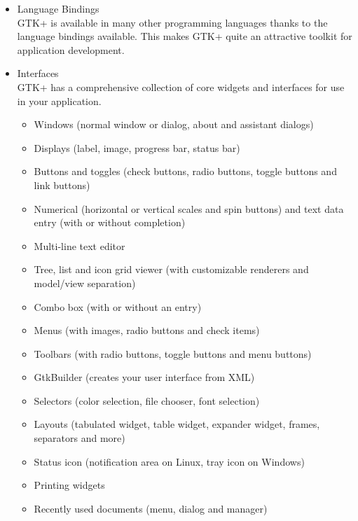 \documentclass[12pt]{article}
\begin{document}
\begin{itemize}

\item Language Bindings\\
GTK+ is available in many other programming languages thanks to the language bindings available. This makes GTK+ quite an attractive toolkit for application development.

\item Interfaces \\
GTK+ has a comprehensive collection of core widgets and interfaces for use in your application.

\begin{itemize}

\item Windows (normal window or dialog, about and assistant dialogs)
\item Displays (label, image, progress bar, status bar)
\item Buttons and toggles (check buttons, radio buttons, toggle buttons and link buttons)
\item Numerical (horizontal or vertical scales and spin buttons) and text data entry (with or without completion)
\item Multi-line text editor
\item Tree, list and icon grid viewer (with customizable renderers and model/view separation)
\item Combo box (with or without an entry)
\item Menus (with images, radio buttons and check items)
\item Toolbars (with radio buttons, toggle buttons and menu buttons)
\item GtkBuilder (creates your user interface from XML)
\item Selectors (color selection, file chooser, font selection)
\item Layouts (tabulated widget, table widget, expander widget, frames, separators and more)
\item Status icon (notification area on Linux, tray icon on Windows)
\item Printing widgets
\item Recently used documents (menu, dialog and manager)


\end{itemize}


\end{itemize}

\clearpage
\end{document}
